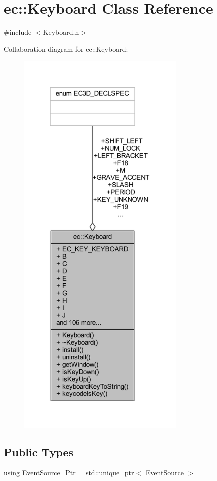 \hypertarget{classec_1_1_keyboard}{}\section{ec\+:\+:Keyboard Class Reference}
\label{classec_1_1_keyboard}


{\ttfamily \#include $<$Keyboard.\+h$>$}



Collaboration diagram for ec\+:\+:Keyboard\+:\nopagebreak
\begin{figure}[H]
\begin{center}
\leavevmode
\includegraphics[height=550pt]{classec_1_1_keyboard__coll__graph}
\end{center}
\end{figure}
\subsection*{Public Types}
\begin{DoxyCompactItemize}
\item 
using \mbox{\hyperlink{classec_1_1_keyboard_a9d797ac5b4d42f3b586091bcc14e6343}{Event\+Source\+\_\+\+Ptr}} = std\+::unique\+\_\+ptr$<$ Event\+Source $>$
\end{DoxyCompactItemize}
